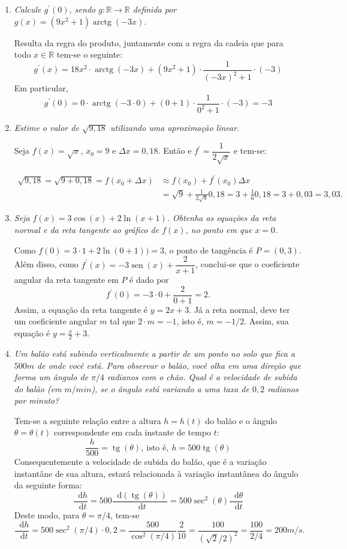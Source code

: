 \documentclass[12pt,a4paper]{article}
\newcommand*\diff{\mathop{}\!\mathrm{d}}
\newcommand*\sen{\operatorname{sen}}
\newcommand*\tg{\operatorname{tg}}
\newcommand*\arctg{\operatorname{arctg}}
\begin{document}
\begin{enumerate}
\item \textit{Calcule $g^\prime(0)$, sendo $g:\mathbb{R} \to \mathbb{R}$ definida por $g(x) = (9x^2 + 1)\arctg(-3x)$.}

Resulta da regra do produto, juntamente com a regra da cadeia que para todo $x \in \mathbb{R}$ tem-se o seguinte:
\[
g^\prime(x) = 18x^2 \cdot \arctg(-3x) + (9x^2 + 1) \cdot \frac{1}{(-3x)^2+1} \cdot (-3)
\]
Em particular,
\[
g^\prime(0)
= 0 \cdot \arctg(-3 \cdot 0) + (0 + 1) \cdot \frac{1}{0^2+1} \cdot (-3)
=-3\]

\item \textit{Estime o valor de $\sqrt{9,18}$ utilizando uma aproximação linear.}

Seja $f(x) = \sqrt{x}$, $x_0 = 9$ e $\Delta x = 0,18$. Então e $f^\prime = \dfrac{1}{2\sqrt{x}}$ e tem-se:

\begin{align*}
\sqrt{9,18} = \sqrt{9 + 0,18}
= f(x_0+\Delta x)
& \approx f(x_0) + f^{\prime}(x_0)\Delta x \\
& = \sqrt{9} + \frac{1}{2\sqrt{9}}0,18
= 3 + \frac{1}{6}0,18
= 3 + 0,03
= 3,03.
\end{align*}

\item \textit{Seja $f(x) = 3 \cos(x) + 2 \ln(x + 1)$. Obtenha as equações da reta normal e da reta tangente ao gráfico de $f(x)$, no ponto em que $x = 0$.}

Como $f(0)= 3 \cdot 1 + 2 \ln(0+1) ) = 3$, o ponto de tangência é $P = (0, 3)$. Além disso, como $f^\prime(x) = -3 \sen(x) + \dfrac{2}{x + 1}$, conclui-se que o coeficiente angular da reta tangente em $P$ é dado por
\[
f^\prime(0) = -3 \cdot 0 + \dfrac{2}{0 + 1} = 2.
\]
Assim, a equação da reta tangente é $y = 2x + 3$. Já a reta normal, deve ter um coeficiente angular $m$ tal que $2 \cdot m = -1$, isto é, $m = -1/2$. Assim, sua equação é $y = \frac{x}{2} + 3$.

\item \textit{Um balão está subindo verticalmente a partir de um ponto no solo que fica a $500m$ de onde você está. Para observar o balão, você olha em uma direção que forma um ângulo de $\pi/4$ radianos com o chão. Qual é a velocidade de subida do balão (em $m/min$), se o ângulo está variando a uma taxa de $0,2$ radianos por minuto?}

Tem-se a seguinte relação entre a altura $h = h(t)$ do balão e o ângulo $\theta = \theta(t)$ correspondente em cada instante de tempo $t$:
\[
\frac{ h }{ 500 } = \tg( \theta ),\ \text{isto é},\
h = 500 \tg( \theta )
\]
Consequentemente a velocidade de subida do balão, que é a variação instantâne de sua altura, estará relacionada à variação instantânea do ângulo da seguinte forma:
\[
\frac{ \diff{ h } }{ \diff{t} }
= 500 \frac{\diff{ (\tg( \theta )) }}{\diff{t}}
= 500 \sec^2( \theta ) \frac{ \diff{ \theta } }{ \diff{t} }
\]
Deste modo, para $\theta = \pi/4$, tem-se
\[
\frac{ \diff{ h } }{ \diff{t} }
= 500 \sec^2( \pi/4 ) \cdot 0,2
= \dfrac{500}{ \cos^2( \pi/4 ) }\dfrac{2}{ 10 }
= \dfrac{100}{ (\sqrt{2}/2)^2 }
= \dfrac{100}{ 2/4 }
= 200m/s.
\]


\end{enumerate}
\end{document}
